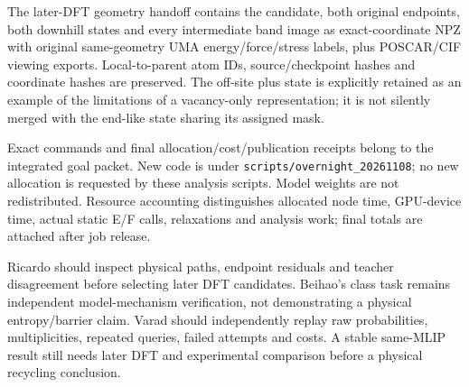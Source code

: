 \documentclass[10pt]{article}
\begin{document}
The later-DFT geometry handoff contains the candidate, both original endpoints,
both downhill states and every intermediate band image as exact-coordinate NPZ
with original same-geometry UMA energy/force/stress labels, plus POSCAR/CIF viewing
exports. Local-to-parent atom IDs, source/checkpoint hashes and coordinate hashes
are preserved. The off-site plus state is explicitly retained as an example of
the limitations of a vacancy-only representation; it is not silently merged with
the end-like state sharing its assigned mask.

Exact commands and final allocation/cost/publication receipts belong to the
integrated goal packet. New code is under
\texttt{scripts/overnight\_20261108}; no new allocation is requested by these
analysis scripts. Model weights are not redistributed. Resource accounting
distinguishes allocated node time, GPU-device time, actual static E/F calls,
relaxations and analysis work; final totals are attached after job release.

Ricardo should inspect physical paths, endpoint residuals and teacher disagreement
before selecting later DFT candidates. Beihao's class task remains independent
model-mechanism verification, not demonstrating a physical entropy/barrier claim.
Varad should independently replay raw probabilities, multiplicities, repeated
queries, failed attempts and costs. A stable same-MLIP result still needs later
DFT and experimental comparison before a physical recycling conclusion.


\end{document}
